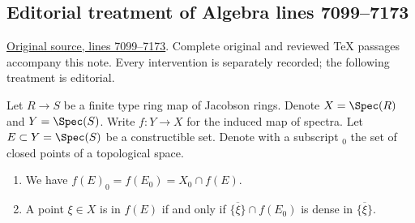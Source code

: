 \subsection{Editorial treatment of Algebra lines 7099--7173}

\hypertarget{algebra-context-065}{}

\noindent\href{https://github.com/stacks/stacks-project/blob/a04446e57ec1fbc252a871afcec7752fb2807b14/algebra.tex\#L7099}{Original source, lines 7099--7173}. Complete original and reviewed TeX passages accompany this note. Every intervention is separately recorded; the following treatment is editorial.


\begin{lemma}
\label{editorial-source-lemma-image-finite-type-map-Jacobson-rings}
Let $R \to S$ be a finite type ring map of Jacobson rings.
Denote $X = \Spec(R)$ and $Y = \Spec(S)$.
Write $f : Y \to X$ for the induced
map of spectra. Let $E \subset Y = \Spec(S)$ be a
constructible set. Denote with a subscript ${}_0$ the set
of closed points of a topological space.
\begin{enumerate}
\item We have $f(E)_0 = f(E_0) = X_0 \cap f(E)$.
\item A point $\xi \in X$ is in $f(E)$ if and only if
$\overline{\{\xi\}} \cap f(E_0)$ is dense in $\overline{\{\xi\}}$.
\end{enumerate}
\end{lemma}

